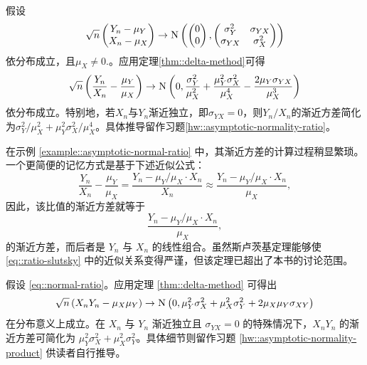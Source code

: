 \begin{example}
[该比值的渐近正态性]\label{example::asymptotic-normal-ratio}
假设\begin{equation}\label{eq::normal-ratio}
\sqrt{n} \begin{pmatrix}
Y_n - \mu_Y \\
X_n - \mu_X
\end{pmatrix}
\rightarrow 
\textsc{N}\left(
\begin{pmatrix}
0\\
0
\end{pmatrix},
\begin{pmatrix}
\sigma_Y^2 & \sigma_{YX} \\
 \sigma_{YX} &  \sigma_X^2 
\end{pmatrix}
\right)
\end{equation}依分布成立，且$\mu_X \neq 0.$。应用定理\ref{thm::delta-method}可得\begin{equation}\label{eq::ratio-normality}
\sqrt{n} \left(   \frac{Y_n}{X_n}  -  \frac{\mu_Y}{\mu_X} \right)
\rightarrow
\textsc{N}\left(0,    \frac{  \sigma_Y^2 }{ \mu_X^2 }  + \frac{ \mu_Y^2 \sigma_X^2}{ \mu_X^4}  - \frac{2\mu_Y \sigma_{YX}}{\mu_X^3} \right)
\end{equation}依分布成立。特别地，若$X_n$与$Y_n$渐近独立，即$\sigma_{YX} = 0$，则$Y_n/X_n$的渐近方差简化为$\sigma_Y^2 / \mu_X^2 + \mu_Y^2 \sigma_X^2 / \mu_X^4$。具体推导留作习题\ref{hw::asymptotic-normality-ratio}。
\end{example}


在示例 \ref{example::asymptotic-normal-ratio} 中，其渐近方差的计算过程稍显繁琐。一个更简便的记忆方式是基于下述近似公式：
\begin{equation}\label{eq::ratio-slutsky}
\frac{Y_n}{X_n}  -  \frac{\mu_Y}{\mu_X}  = \frac{Y_n -  \mu_Y/\mu_X \cdot X_n  }{X_n} \approx   \frac{Y_n -  \mu_Y/\mu_X \cdot X_n  }{\mu_X}, 
\end{equation}
因此，该比值的渐近方差就等于 $$
 \frac{Y_n -  \mu_Y/\mu_X \cdot X_n  }{\mu_X},
 $$ 的渐近方差，而后者是 $Y_n$ 与 $X_n$ 的线性组合。虽然斯卢茨基定理能够使 \eqref{eq::ratio-slutsky} 中的近似关系变得严谨，但该定理已超出了本书的讨论范围。 


\begin{example}
[乘积的渐近正态性]\label{example::asymptotic-normal-product}
假设 \eqref{eq::normal-ratio}。应用定理 \ref{thm::delta-method} 可得出 \begin{equation}\label{eq::product-normality}
\sqrt{n} \left(   X_n  Y_n  -  \mu_X \mu_Y \right)
\rightarrow
\textsc{N}\left(0,     \mu_Y^2 \sigma_X^2 + \mu_X^2 \sigma_Y^2 + 2 \mu_X \mu_Y \sigma_{XY} \right)
\end{equation} 在分布意义上成立。在 $X_n$ 与 $Y_n$ 渐近独立且 $\sigma_{YX} = 0$ 的特殊情况下，$X_n Y_n$ 的渐近方差可简化为 $\mu_Y^2 \sigma_X^2 + \mu_X^2 \sigma_Y^2$。具体细节则留作习题 \ref{hw::asymptotic-normality-product} 供读者自行推导。
\end{example}




